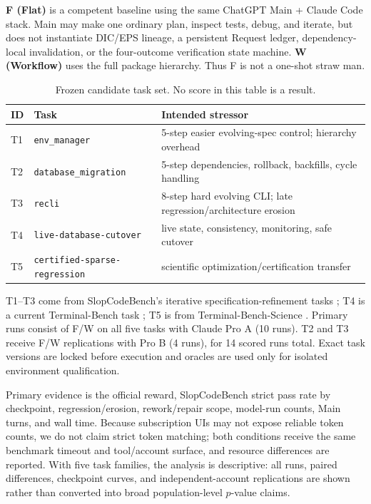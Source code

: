\documentclass{article}
\begin{document}
\textbf{F (Flat)} is a competent baseline using the same ChatGPT Main + Claude Code stack. Main may make one ordinary plan, inspect tests, debug, and iterate, but does not instantiate DIC/EPS lineage, a persistent Request ledger, dependency-local invalidation, or the four-outcome verification state machine. \textbf{W (Workflow)} uses the full package hierarchy. Thus F is not a one-shot straw man.

\begin{table}[t]
\centering\small
\caption{Frozen candidate task set. No score in this table is a result.}
\label{tab:tasks}
\begin{tabularx}{\linewidth}{@{}l l X@{}}
\toprule
ID & Task & Intended stressor\\\midrule
T1 & \texttt{env\_manager} & 5-step easier evolving-spec control; hierarchy overhead\\
T2 & \texttt{database\_migration} & 5-step dependencies, rollback, backfills, cycle handling\\
T3 & \texttt{recli} & 8-step hard evolving CLI; late regression/architecture erosion\\
T4 & \texttt{live-database-cutover} & live state, consistency, monitoring, safe cutover\\
T5 & \texttt{certified-sparse-regression} & scientific optimization/certification transfer\\
\bottomrule
\end{tabularx}
\end{table}

T1--T3 come from SlopCodeBench's iterative specification-refinement tasks \citep{orlanski2026slopcodebench}; T4 is a current Terminal-Bench task \citep{merrill2026terminalbench}; T5 is from Terminal-Bench-Science \citep{terminalbenchscience2026}. Primary runs consist of F/W on all five tasks with Claude Pro A (10 runs). T2 and T3 receive F/W replications with Pro B (4 runs), for 14 scored runs total. Exact task versions are locked before execution and oracles are used only for isolated environment qualification.

Primary evidence is the official reward, SlopCodeBench strict pass rate by checkpoint, regression/erosion, rework/repair scope, model-run counts, Main turns, and wall time. Because subscription UIs may not expose reliable token counts, we do not claim strict token matching; both conditions receive the same benchmark timeout and tool/account surface, and resource differences are reported. With five task families, the analysis is descriptive: all runs, paired differences, checkpoint curves, and independent-account replications are shown rather than converted into broad population-level $p$-value claims.
\end{document}

